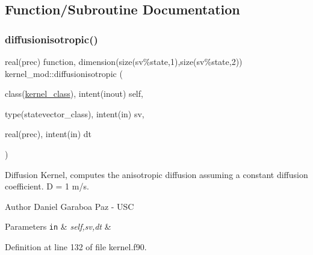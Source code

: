 \subsection{Function/\+Subroutine Documentation}
\mbox{\label{namespacekernel__mod_a92805ef71e30527b27de4efd7561f8f7}} 
\subsubsection{\texorpdfstring{diffusionisotropic()}{diffusionisotropic()}}
{\footnotesize\ttfamily real(prec) function, dimension(size(sv\%state,1),size(sv\%state,2)) kernel\+\_\+mod\+::diffusionisotropic (\begin{DoxyParamCaption}\item[{class(\mbox{\hyperlink{structkernel__mod_1_1kernel__class}{kernel\+\_\+class}}), intent(inout)}]{self,  }\item[{type(statevector\+\_\+class), intent(in)}]{sv,  }\item[{real(prec), intent(in)}]{dt }\end{DoxyParamCaption})}



Diffusion Kernel, computes the anisotropic diffusion assuming a constant diffusion coefficient. D = 1 m/s. 

\begin{DoxyAuthor}{Author}
Daniel Garaboa Paz -\/ U\+SC 
\end{DoxyAuthor}

\begin{DoxyParams}[1]{Parameters}
\mbox{\tt in}  & {\em self,sv,dt} & \\
\hline
\end{DoxyParams}


Definition at line 132 of file kernel.\+f90.


